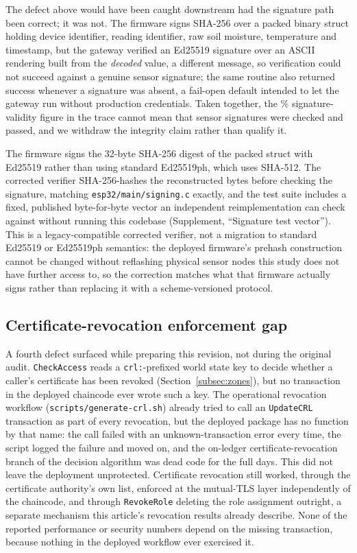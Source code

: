 \documentclass[a4paper,fleqn]{cas-sc}
\begin{document}
The defect above would have been caught downstream had the signature path
been correct; it was not. The firmware signs SHA-256 over a packed binary
struct holding device identifier, reading identifier, raw soil moisture,
temperature and timestamp, but the gateway verified an Ed25519 signature
over an ASCII rendering built from the \emph{decoded} value, a different
message, so verification could not succeed against a genuine sensor
signature; the same routine also returned success whenever a signature
was absent, a fail-open default intended to let the gateway run without
production credentials. Taken together, the \SigValidPct\%
signature-validity figure in the trace cannot mean that sensor signatures
were checked and passed, and we withdraw the integrity claim rather than
qualify it.

The firmware signs the 32-byte SHA-256 digest of the packed struct with
Ed25519 rather than using standard Ed25519ph, which uses SHA-512.
The corrected verifier SHA-256-hashes the reconstructed bytes
before checking the signature, matching \texttt{esp32/main/signing.c}
exactly, and the test suite includes a fixed, published byte-for-byte
vector an independent reimplementation can check against without running
this codebase (Supplement, ``Signature test vector''). This is a
legacy-compatible corrected verifier, not a migration to standard
Ed25519 or Ed25519ph semantics: the deployed firmware's prehash
construction cannot be changed without reflashing physical sensor nodes
this study does not have further access to, so the correction matches
what that firmware actually signs rather than replacing it with a
scheme-versioned protocol.

\subsection{Certificate-revocation enforcement gap}
\label{subsec:pm_crl}

A fourth defect surfaced while preparing this revision, not during the
original audit. \texttt{CheckAccess} reads a \texttt{crl:}-prefixed world
state key to decide whether a caller's certificate has been revoked
(Section~\ref{subsec:zones}), but no transaction in the deployed chaincode
ever wrote such a key. The operational revocation workflow
(\texttt{scripts/generate-crl.sh}) already tried to call an
\texttt{UpdateCRL} transaction as part of every revocation, but the
deployed package has no function by that name: the call failed with an
unknown-transaction error every time, the script logged the failure and
moved on, and the on-ledger certificate-revocation branch of the decision
algorithm was dead code for the full \DeployDays{} days. This did not leave
the deployment unprotected. Certificate revocation still worked, through
the certificate authority's own list, enforced at the mutual-TLS layer
independently of the chaincode, and through \texttt{RevokeRole} deleting
the role assignment outright, a separate mechanism this article's
revocation results already describe. None of the reported performance or
security numbers depend on the missing transaction, because nothing in the
deployed workflow ever exercised it.
\end{document}
